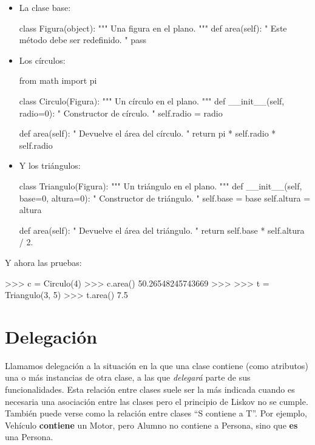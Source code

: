 \begin{itemize}
\item La clase base:

\begin{codigo-python-sn}
class Figura(object):
    """ Una figura en el plano. """
    def area(self):
        " Este método debe ser redefinido. "
        pass
\end{codigo-python-sn}

\item Los círculos:

\begin{codigo-python-sn}
from math import pi

class Circulo(Figura):
    """ Un círculo en el plano. """
    def __init__(self, radio=0):
        " Constructor de círculo. "
        self.radio = radio

    def area(self):
        " Devuelve el área del círculo. "
        return pi * self.radio * self.radio
\end{codigo-python-sn}

\item Y los triángulos:

\begin{codigo-python-sn}
class Triangulo(Figura):
    """ Un triángulo en el plano. """
    def __init__(self, base=0, altura=0):
        " Constructor de triángulo. "
        self.base = base
        self.altura = altura

    def area(self):
        " Devuelve el área del triángulo. "
        return self.base * self.altura / 2.
\end{codigo-python-sn}

\end{itemize}

Y ahora las pruebas:
\begin{codigo-python-sn}
>>> c = Circulo(4)
>>> c.area()
50.26548245743669
>>>
>>> t = Triangulo(3, 5)
>>> t.area()
7.5
\end{codigo-python-sn}

\section{Delegación}

Llamamos delegación a la situación en la que una clase contiene (como
atributos) una o más instancias de otra clase, a las que {\it delegará}
parte de sus funcionalidades. Esta relación entre clases suele ser la más
indicada cuando es necesaria una asociación entre las clases pero el
principio de Liskov no se cumple. También puede verse como la relación
entre clases ``S contiene a T''. Por ejemplo, Vehículo {\bf contiene} un
Motor, pero Alumno no contiene a Persona, sino que {\bf es} una Persona. \\

